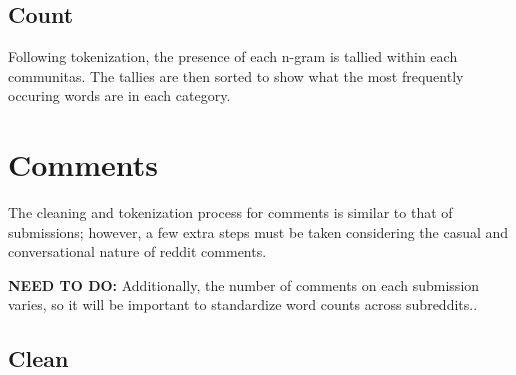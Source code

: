 \documentclass[
]{book}
\newenvironment{Shaded}{\begin{snugshade}}{\end{snugshade}}
\newcommand{\CommentTok}[1]{\textcolor[rgb]{0.56,0.35,0.01}{\textit{#1}}}
\newcommand{\DataTypeTok}[1]{\textcolor[rgb]{0.13,0.29,0.53}{#1}}
\newcommand{\KeywordTok}[1]{\textcolor[rgb]{0.13,0.29,0.53}{\textbf{#1}}}
\newcommand{\NormalTok}[1]{#1}
\newcommand{\OperatorTok}[1]{\textcolor[rgb]{0.81,0.36,0.00}{\textbf{#1}}}
\newcommand{\OtherTok}[1]{\textcolor[rgb]{0.56,0.35,0.01}{#1}}
\newcommand{\StringTok}[1]{\textcolor[rgb]{0.31,0.60,0.02}{#1}}
\begin{document}
\hypertarget{count}{%
\subsection{Count}\label{count}}

Following tokenization, the presence of each n-gram is tallied within each communitas. The tallies are then sorted to show what the most frequently occuring words are in each category.

\begin{Shaded}
\end{Shaded}

\hypertarget{comments}{%
\section{Comments}\label{comments}}

The cleaning and tokenization process for comments is similar to that of submissions; however, a few extra steps must be taken considering the casual and conversational nature of reddit comments.

\textbf{NEED TO DO:} Additionally, the number of comments on each submission varies, so it will be important to standardize word counts across subreddits..

\hypertarget{clean-1}{%
\subsection{Clean}\label{clean-1}}
\end{document}
